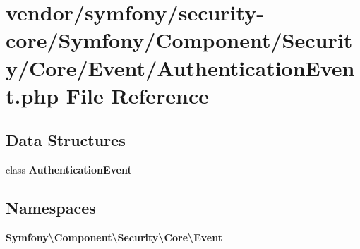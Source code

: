 \section{vendor/symfony/security-\/core/\+Symfony/\+Component/\+Security/\+Core/\+Event/\+Authentication\+Event.php File Reference}
\label{_authentication_event_8php}
\subsection*{Data Structures}
\begin{DoxyCompactItemize}
\item 
class {\bf Authentication\+Event}
\end{DoxyCompactItemize}
\subsection*{Namespaces}
\begin{DoxyCompactItemize}
\item 
 {\bf Symfony\textbackslash{}\+Component\textbackslash{}\+Security\textbackslash{}\+Core\textbackslash{}\+Event}
\end{DoxyCompactItemize}
